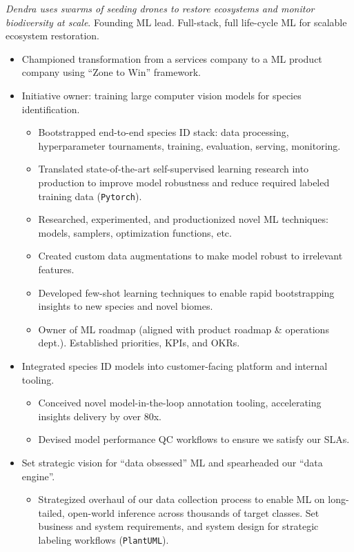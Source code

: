 \documentclass[a4paper,12pt]{article}
\begin{document}
    \vspace{-6pt} \textit{Dendra uses swarms of seeding drones to restore ecosystems and monitor biodiversity at scale}. Founding ML lead. Full-stack, full life-cycle ML for scalable ecosystem restoration.
    \begin{itemize}
        \item Championed transformation from a services company to a ML product company using ``Zone to Win'' framework.
        \item Initiative owner: training large computer vision models for species identification.
        \begin{itemize}
            \item Bootstrapped end-to-end species ID stack: data processing, hyperparameter tournaments, training, evaluation, serving, monitoring.
            \item Translated state-of-the-art self-supervised learning research into production to improve model robustness and reduce required labeled training data (\texttt{Pytorch}).
            \item Researched, experimented, and productionized novel ML techniques: models, samplers, optimization functions, etc.
            \item Created custom data augmentations to make model robust to irrelevant features.
            \item Developed few-shot learning techniques to enable rapid bootstrapping insights to new species and novel biomes.
            \item Owner of ML roadmap (aligned with product roadmap \& operations dept.). Established priorities, KPIs, and OKRs.
        \end{itemize}
        \item Integrated species ID models into customer-facing platform and internal tooling.
        \begin{itemize}
            \item Conceived novel model-in-the-loop annotation tooling, accelerating insights delivery by over 80x.
            \item Devised model performance QC workflows to ensure we satisfy our SLAs.
        \end{itemize}
        \item Set strategic vision for ``data obsessed'' ML and spearheaded our ``data engine''.
        \begin{itemize}
            \item Strategized overhaul of our data collection process to enable ML on long-tailed, open-world inference across thousands of target classes. Set business and system requirements, and system design for strategic labeling workflows (\texttt{PlantUML}).

\end{itemize}
\end{itemize}
\end{document}
